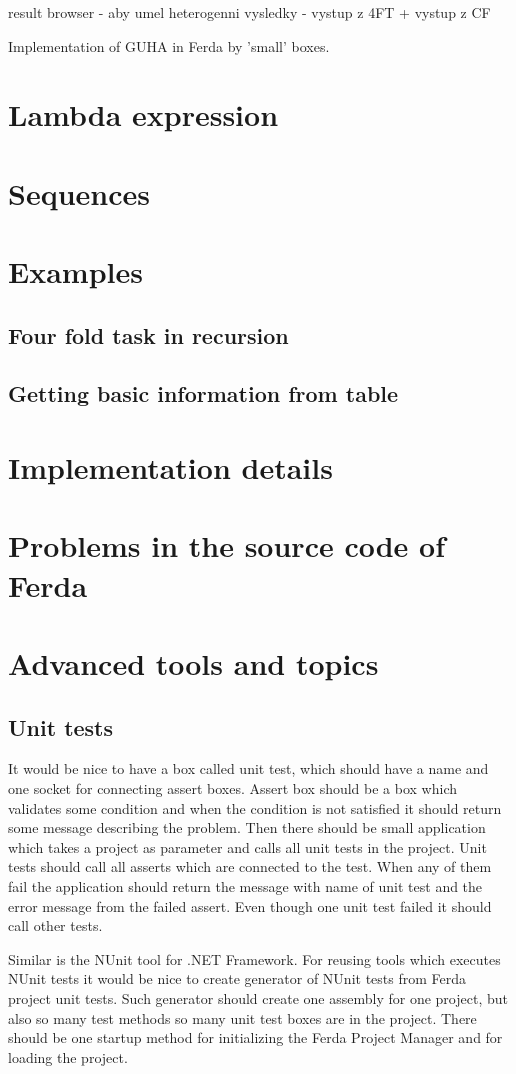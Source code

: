 \documentclass[a4paper,12pt]{book}
\begin{document}
result browser - aby umel heterogenni vysledky - vystup z 4FT + vystup z CF

Implementation of GUHA in Ferda by 'small' boxes.
\section{Lambda expression}
\section{Sequences}
\section{Examples}
\subsection{Four fold task in recursion}
\subsection{Getting basic information from table}
\section{Implementation details}
\section{Problems in the source code of Ferda}
\section{Advanced tools and topics}
\subsection{Unit tests}
It would be nice to have a box called unit test, which should have a name and one socket for connecting assert boxes. Assert box should be a box which validates some condition and when the condition is not satisfied it should return some message describing the problem. Then there should be small application which takes a project as parameter and calls all unit tests in the project. Unit tests should call all asserts which are connected to the test. When any of them fail the application should return the message with name of unit test and the error message from the failed assert. Even though one unit test failed it should call other tests.

Similar is the NUnit tool for .NET Framework. For reusing tools which executes NUnit tests it would be nice to create generator of NUnit tests from Ferda project unit tests. Such generator should create one assembly for one project, but also so many test methods so many unit test boxes are in the project. There should be one startup method for initializing the Ferda Project Manager and for loading the project. 
\end{document}
